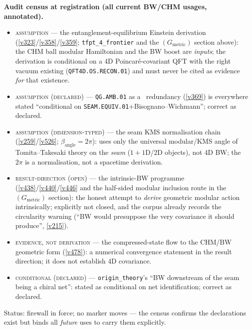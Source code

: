 \par\smallskip\noindent\textbf{Audit census at registration (all current BW/CHM usages,
annotated).}
\begin{itemize}
\item \textsc{assumption} --- the entanglement-equilibrium Einstein derivation
  (\vref{v323}/\vref{v358}/\vref{v359}; \texttt{tfpt\_4\_frontier} and the $(G_{\mathrm{metric}})$
  section above): the CHM ball modular Hamiltonian and the BW boost are \emph{inputs}; the
  derivation is conditional on a 4D Poincar\'e-covariant QFT with the right vacuum existing
  (\texttt{QFT4D.OS.RECON.01}) and must never be cited as evidence \emph{for} that existence.
\item \textsc{assumption (declared)} --- \texttt{QG.AMB.01} as a \mC\ redundancy (\vref{v369})
  is everywhere stated ``conditional on \texttt{SEAM.EQUIV.01}$+$Bisognano--Wichmann''; correct
  as declared.
\item \textsc{assumption (dimension-typed)} --- the seam KMS normalisation chain
  (\vref{v259}/\vref{v526}; $\beta_{\mathrm{angle}}=2\pi$): uses only the universal modular/KMS
  angle of Tomita--Takesaki theory on the \emph{seam} ($1{+}1$D/2D objects), not 4D BW; the
  $2\pi$ is a normalisation, not a spacetime derivation.
\item \textsc{result-direction (open)} --- the intrinsic-BW programme
  (\vref{v438}/\vref{v440}/\vref{v446} and the half-sided modular inclusion route in the
  $(G_{\mathrm{metric}})$ section): the honest attempt to \emph{derive} geometric modular action
  intrinsically; explicitly not closed, and the corpus already records the circularity warning
  (``BW would presuppose the very covariance it should produce'', \vref{v215}).
\item \textsc{evidence, not derivation} --- the compressed-state flow to the CHM/BW geometric
  form (\vref{v478}): a numerical convergence statement in the result direction; it does not
  establish 4D covariance.
\item \textsc{conditional (declared)} --- \texttt{origin\_theory}'s ``BW downstream of the seam
  being a chiral net'': stated as conditional on net identification; correct as declared.
\end{itemize}
Status: firewall in force; no marker moves --- the census confirms the declarations exist but
binds all \emph{future} uses to carry them explicitly.

